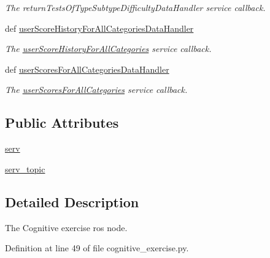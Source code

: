 \begin{DoxyCompactItemize}
\begin{DoxyCompactList}\small\item\em The return\-Tests\-Of\-Type\-Subtype\-Difficulty\-Data\-Handler service callback. \end{DoxyCompactList}\item 
def \hyperlink{classcognitive__exercise_1_1CognitiveExercise_a8b5d8e068ebf59bb0c326e2c4f07505b}{user\-Score\-History\-For\-All\-Categories\-Data\-Handler}
\begin{DoxyCompactList}\small\item\em The \hyperlink{namespaceuserScoreHistoryForAllCategories}{user\-Score\-History\-For\-All\-Categories} service callback. \end{DoxyCompactList}\item 
def \hyperlink{classcognitive__exercise_1_1CognitiveExercise_a6b2c53eeb47502d91fc93a1fbde7a07e}{user\-Scores\-For\-All\-Categories\-Data\-Handler}
\begin{DoxyCompactList}\small\item\em The \hyperlink{namespaceuserScoresForAllCategories}{user\-Scores\-For\-All\-Categories} service callback. \end{DoxyCompactList}\end{DoxyCompactItemize}
\subsection*{Public Attributes}
\begin{DoxyCompactItemize}
\item 
\hyperlink{classcognitive__exercise_1_1CognitiveExercise_a31a4e22c02bc1d7bda11b5e1fda5d065}{serv}
\item 
\hyperlink{classcognitive__exercise_1_1CognitiveExercise_a01c12d3ff9258c812e34f89a516699ed}{serv\-\_\-topic}
\end{DoxyCompactItemize}


\subsection{Detailed Description}
The Cognitive exercise ros node. 

Definition at line 49 of file cognitive\-\_\-exercise.\-py.




